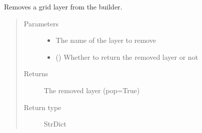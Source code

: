 \documentclass[letterpaper,10pt,english]{sphinxmanual}
\begin{document}
\begin{fulllineitems}
\begin{fulllineitems}
\begin{quote}
\begin{description}
\begin{itemize}
\end{itemize}

\end{description}\end{quote}

\end{fulllineitems}


\begin{fulllineitems}
\label{\detokenize{builder:geohexviz.builder.PlotBuilder.remove_grid}}
\sphinxAtStartPar
Removes a grid layer from the builder.
\begin{quote}\begin{description}
\item[{Parameters}] \leavevmode\begin{itemize}
\item {} 
\sphinxAtStartPar
{} \textendash{} The name of the layer to remove

\item {} 
\sphinxAtStartPar
{} () \textendash{} Whether to return the removed layer or not

\end{itemize}

\item[{Returns}] \leavevmode
\sphinxAtStartPar
The removed layer (pop=True)

\item[{Return type}] \leavevmode
\sphinxAtStartPar
StrDict

\end{description}\end{quote}

\end{fulllineitems}



\end{fulllineitems}
\end{document}
